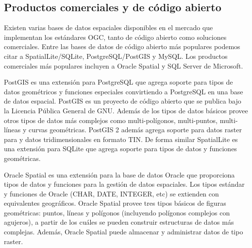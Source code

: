 \subsection{Productos comerciales y de código abierto}

Existen varias bases de datos espaciales disponibles en el mercado que implementan los estándares OGC, tanto de código abierto como soluciones comerciales. Entre las bases de datos de código abierto más populares podemos citar a SpatialLite/SQLite, PostgreSQL/PostGIS y MySQL. Los productos comerciales más populares incluyen a Oracle Spatial y SQL Server de Microsoft.

PostGIS es una extensión para PostgreSQL que agrega soporte para tipos de datos geométricos y funciones especiales convirtiendo a PostgreSQL en una base de datos espacial. PostGIS es un proyecto de código abierto que se publica bajo la Licencia Pública General de GNU. Además de los tipos de datos básicos provee otros tipos de datos más complejos como multi-polígonos, multi-puntos, multi-líneas y curvas geométricas. PostGIS 2 además agrega soporte para datos raster para  y datos tridimensionales en formato TIN. De forma similar SpatialLite es una extensión para SQLite que agrega soporte para tipos de datos y funciones geométricas.

Oracle Spatial es una extensión para la base de datos Oracle que proporciona tipos de datos y funciones para la gestión de datos espaciales. Los tipos estándar y funciones de Oracle (CHAR, DATE, INTEGER, etc) se extienden con equivalentes geográficos. Oracle Spatial provee tres tipos básicos de figuras geométricas: puntos, líneas y polígonos (incluyendo polígonos complejos con agujeros), a partir de los cuáles se pueden construir estructuras de datos más complejas. Además, Oracle Spatial puede almacenar y administrar datos de tipo raster.
